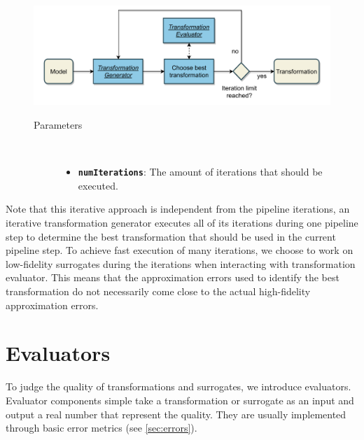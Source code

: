 \documentclass[
  a4paper,  %
  twoside,  %
  bibliography=totoc,
  headsepline,
  cleardoublepage=empty,
  parskip=half,
  draft=false
]{scrbook}
\begin{document}
\begin{mdframed}[style=style,frametitle={Transformation generator (iterative)}]
\begin{figure}[H]
	\includegraphics[width=\textwidth]{graphics/TransformationGen_Iterative.pdf}

\delimit

\begin{description}
\item[Parameters] {~ \begin{itemize}[\null]
\item \texttt{\textbf{numIterations}}: The amount of iterations that should be executed.
\end{itemize}}
\end{description}

\delimit
{}
\label{fig:itg}
\end{figure}
\end{mdframed}
%
Note that this iterative approach is independent from the pipeline iterations, \ie an iterative transformation generator executes all of its iterations during one pipeline step to determine the best transformation that should be used in the current pipeline step.
To achieve fast execution of many iterations, we choose to work on low-fidelity surrogates during the iterations when interacting with transformation evaluator.
This means that the approximation errors used to identify the best transformation do not necessarily come close to the actual high-fidelity approximation errors.

\newpage
\section {Evaluators}

To judge the quality of transformations and surrogates, we introduce evaluators.
Evaluator components simple take a transformation or surrogate as an input and output a real number that represent the quality.
They are usually implemented through basic error metrics (see \cref{sec:errors}).
\end{document}
